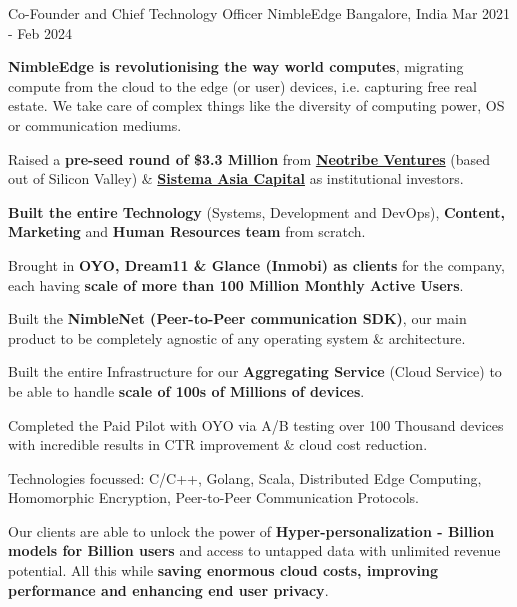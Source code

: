 \begin{cventries}

  \cventry
    {Co-Founder and Chief Technology Officer} %
    {NimbleEdge} %
    {Bangalore, India} %
    {Mar 2021 - Feb 2024} %
    {
      \begin{cvitems} %
      \item {\textbf{NimbleEdge is revolutionising the way world computes}, migrating compute from the cloud to the edge (or user) devices, i.e. capturing free real estate. We take care of complex things like the diversity of computing power, OS or communication mediums.}
        \item {Raised a \textbf{pre-seed round of \$3.3 Million} from \href{http://www.neotribe.vc/}{\textbf{Neotribe Ventures}} (based out of Silicon Valley) \& \href{https://sistemaasiacapital.com/}{\textbf{Sistema Asia Capital}} as institutional investors.}
        \item {\textbf{Built the entire Technology} (Systems, Development and DevOps), \textbf{Content, Marketing} and \textbf{Human Resources team} from scratch.}
        \item {Brought in \textbf{OYO, Dream11 \& Glance (Inmobi) as clients} for the company, each having \textbf{scale of more than 100 Million Monthly Active Users}.}
        \item {Built the \textbf{NimbleNet (Peer-to-Peer communication SDK)}, our main product to be completely agnostic of any operating system \& architecture.}
        \item {Built the entire Infrastructure for our \textbf{Aggregating Service} (Cloud Service) to be able to handle \textbf{scale of 100s of Millions of devices}.}
        \item {Completed the Paid Pilot with OYO via A/B testing over 100 Thousand devices with incredible results in CTR improvement \& cloud cost reduction.}
        \item {Technologies focussed: C/C++, Golang, Scala, Distributed Edge Computing, Homomorphic Encryption, Peer-to-Peer Communication Protocols.}
        \item {Our clients are able to unlock the power of \textbf{Hyper-personalization - Billion models for Billion users} and access to untapped data with unlimited revenue potential. All this while \textbf{saving enormous cloud costs, improving performance and enhancing end user privacy}.}
      \end{cvitems}
    }


\end{cventries}
